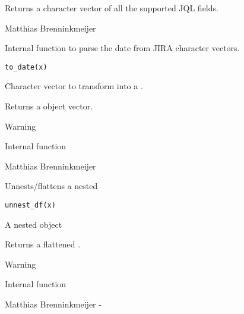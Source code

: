 \documentclass[a4paper]{book}
\begin{document}
%
\begin{Value}
Returns a character vector of all the supported JQL fields.
\end{Value}
%
\begin{Author}\relax
Matthias Brenninkmeijer 
\end{Author}
%
\begin{Description}\relax
Internal function to parse the date from JIRA character vectors.
\end{Description}
%
\begin{Usage}
\begin{verbatim}
to_date(x)
\end{verbatim}
\end{Usage}
%
\begin{Arguments}
\begin{ldescription}
\item[\code{x}] Character vector to transform into a .
\end{ldescription}
\end{Arguments}
%
\begin{Value}
Returns a  object vector.
\end{Value}
%
\begin{Section}{Warning}

Internal function
\end{Section}
%
\begin{Author}\relax
Matthias Brenninkmeijer 
\end{Author}
%
\begin{Description}\relax
Unnests/flattens a nested 
\end{Description}
%
\begin{Usage}
\begin{verbatim}
unnest_df(x)
\end{verbatim}
\end{Usage}
%
\begin{Arguments}
\begin{ldescription}
\item[\code{x}] A nested  object
\end{ldescription}
\end{Arguments}
%
\begin{Value}
Returns a flattened .
\end{Value}
%
\begin{Section}{Warning}

Internal function
\end{Section}
%
\begin{Author}\relax
Matthias Brenninkmeijer - 
\end{Author}
\printindex{}
\end{document}

